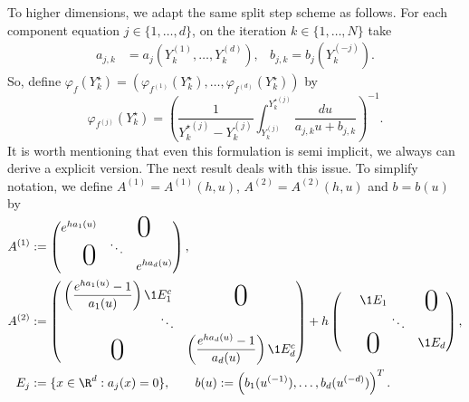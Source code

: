 \documentclass[3p]{elsarticle}
\theoremstyle{definition}
\theoremstyle{plain}%
\theoremstyle{remark}
\begin{document}
	To higher dimensions, we adapt the same split step scheme  as follows. 
For each component equation $j\in\{1, \ldots,  d\}$, on the iteration $k\in\{1, \ldots,  N\}$ take
\begin{align}
	a_{j,k} &=
	a_j
	\left(
		Y^{(1)}_{k},
		\ldots, Y^{(d)}_{k}
	\right),
	&
	b_{j,k} =
	b_{j}
	\left(
			Y^{(-j)}_k
	\right).
\end{align}
So, define  
$
	\varphi_{f}(Y_k^{\star})=
		\left(
			\varphi_{f^{(1)}}(Y_k^{\star}),
			\ldots,
			\varphi_{f^{(d)}}(Y_k^{\star})
		\right)
$
by
\begin{equation}
	\varphi_{f^{(j)}}\left(Y_k^{\star}\right)
		=
		\left(
			\frac{1}{Y_{k}^{\star(j)}-Y_{k}^{(j)}}
			\int 
				_{Y_{k}^{(j)}}^{Y_{k}^{\star(j)}}
				\frac{du}
				{
					a_{j,k} u
					+b_{j,k}
				}
		\right)^{-1}.
\end{equation}
%
	It is worth mentioning that even this formulation is semi implicit, we always can derive a explicit version. 
The next result deals with this issue. To simplify notation, we define  $A^{(1)}= A^{(1)}(h,u)$,  $A^{(2)}=A^{(2)}(h,u)$  and $b=b(u)$ by 
\begin{align}\label{eqn:SolutionFunctions}	
	A^{(1)}&:=
		\begin{pmatrix}
			e^{ha_1(u)} & \multicolumn{2}{c}{\text{\kern0.5em\smash{\raisebox{-1ex}{\Huge 0}}}} \\
			&\ddots\\
			\multicolumn{2}{c}{\text{\kern-0.5em\smash{\raisebox{0.95ex}{\Huge 0}}}} 
			& e^{ha_d(u)}
		\end{pmatrix},
		\notag
		\\
	A^{(2)}&:=
	\begin{pmatrix}
		\left(
			\displaystyle
			\frac{e^{ha_1(u)} - 1}{a_1(u)}
		\right)\1{E_1^c}%
		&\BigZero\\
		\qquad \qquad \qquad \qquad\ddots&\\
		\BigZero&
		\left(
			\displaystyle
			\frac{e^{ha_d(u)} - 1}{a_d(u)}
		\right)\1{E_d^c}%
	\end{pmatrix}
	+h
	\begin{pmatrix}
		\1{E_1} & \BigZero\\
		\qquad \qquad \ddots\\
		\BigZero & 
		\1{E_d}
	\end{pmatrix},\\	
	E_j&:=\{x \in \R^d: a_j(x)=0\} , \qquad 
	b(u):= \left(
		b_1(u^{(-1)}), \dots , b_d(u^{(-d)})
	\right)^T.		
	\notag
\end{align}
\end{document}
